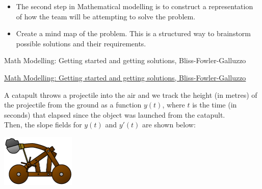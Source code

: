 \begin{lesson}

	\begin{itemize}
		\item The second step in Mathematical modelling is to construct a representation of how the team will be attempting to solve the problem.
		\item Create a mind map of the problem. This is a structured way to brainstorm possible solutions and their requirements.
	\end{itemize}
	

\begin{annotation}
	\begin{goals}
	Math Modelling: Getting started and getting solutions, Bliss-Fowler-Galluzzo
	
	\hfill {}	
	\end{goals}
\end{annotation}
	 \href{https://m3challenge.siam.org/resources/modeling-handbook}{Math Modelling: Getting started and getting solutions, Bliss-Fowler-Galluzzo}

\end{lesson}




\newpage

\question
\begin{minipage}{.7\textwidth}
	A catapult throws a projectile into the air and we track the height (in metres) of the projectile from the ground as a function $y(t)$, where $t$ is the time (in seconds) that elapsed since the object was launched from the catapult. \\

	Then, the slope fields for $y(t)$ and $y'(t)$ are shown below:
\end{minipage}\hfill
\begin{minipage}{100pt}
	\includegraphics*[width=100pt]{images/module9-catapult.pdf}	
\end{minipage}






